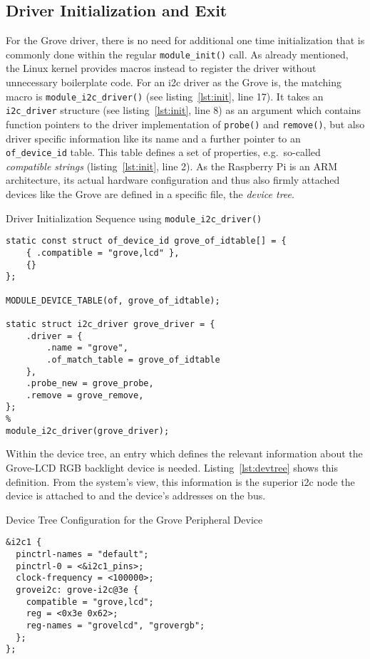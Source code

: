 \subsection{Driver Initialization and Exit}
For the Grove driver, there is no need for additional one time initialization that is commonly done within the regular \texttt{module_init()} call.
As already mentioned, the Linux kernel provides macros instead to register the driver without unnecessary boilerplate code.
For an \ac{i2c} driver as the Grove is, the matching macro is \texttt{module_i2c_driver()} (see listing~\ref{lst:init}, line 17).
It takes an \texttt{i2c_driver} structure (see listing~\ref{lst:init}, line 8) as an argument which contains function pointers to the driver implementation of \texttt{probe()} and \texttt{remove()}, but also driver specific information like its name and a further pointer to an \texttt{of_device_id} table.
This table defines a set of properties, e.g.\ so-called \textit{compatible strings} (listing~\ref{lst:init}, line 2).
As the Raspberry Pi is an ARM architecture, its actual hardware configuration and thus also firmly attached devices like the Grove are defined in a specific file, the \textit{device tree}. 
%
\begin{listing} [ht]
    \caption{Driver Initialization Sequence using \texttt{module\_i2c\_driver()}}
    \label{lst:init}
    \begin{verbatim}
static const struct of_device_id grove_of_idtable[] = {
    { .compatible = "grove,lcd" },
    {}
};

MODULE_DEVICE_TABLE(of, grove_of_idtable);

static struct i2c_driver grove_driver = {
    .driver = {
        .name = "grove",
        .of_match_table = grove_of_idtable
    },
    .probe_new = grove_probe,
    .remove = grove_remove,
};
%
module_i2c_driver(grove_driver);
    \end{verbatim}
\end{listing}
%
Within the device tree, an entry which defines the relevant information about the Grove-LCD RGB backlight device is needed.
Listing~\ref{lst:devtree} shows this definition.
From the system's view, this information is the superior \ac{i2c} node the device is attached to and the device's addresses on the bus.
%
\begin{listing} [ht]
    \caption{Device Tree Configuration for the Grove Peripheral Device}
    \label{lst:devtree}
    \begin{verbatim}
&i2c1 {
  pinctrl-names = "default";
  pinctrl-0 = <&i2c1_pins>;
  clock-frequency = <100000>;
  grovei2c: grove-i2c@3e {
    compatible = "grove,lcd";
    reg = <0x3e 0x62>;
    reg-names = "grovelcd", "grovergb";
  };
};
    \end{verbatim}
\end{listing}
